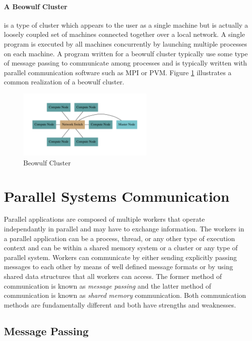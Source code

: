 \documentclass[11pt]{book}
\begin{document}
\paragraph{A Beowulf Cluster} is a type of cluster which appears to the user as a single
machine but is actually a loosely coupled set of machines connected together over a local
network. A single program is executed by all machines concurrently by launching multiple
processes on each machine. A program written for a beowulf cluster typically use some type
of message passing to communicate among processes and is typically written with parallel
communication software such as MPI or PVM. Figure \ref{beowulf} illustrates a common realization
of a beowulf cluster.

\begin{figure}[H]
    \centering
    \includegraphics[width=0.6\textwidth,quiet]{figs/graphviz/beowulf.pdf}
    \caption{Beowulf Cluster}\label{beowulf}
\end{figure}

\section{Parallel Systems Communication}

Parallel applications are composed of multiple workers that operate independantly in parallel
and may have to exchange information. The workers in a parallel application can be a process,
thread, or any other type of execution context and can be within a shared memory system or a
cluster or any type of parallel system. Workers can communicate by either sending explicitly
passing messages to each other by means of well defined message formats or by using shared
data structures that all workers can access. The former method of communication is known as
\emph{message passing} and the latter method of communication is known as \emph{shared memory}
communication. Both communication methods are fundamentally different and both have strengths
and weaknesses.

\subsection{Message Passing}
\end{document}

